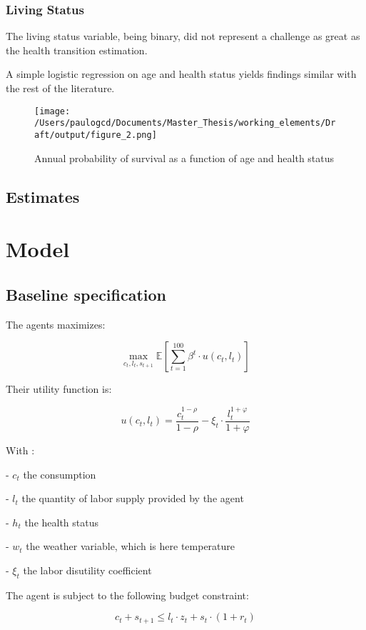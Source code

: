\documentclass{article}
\begin{document}
\subsubsection{Living Status}

The living status variable, being binary, did not represent a challenge
as great as the health transition estimation.

A simple logistic regression on age and health status yields findings similar with the
rest of the literature. 

\begin{figure}[ht]
    \texttt{[image: /Users/paulogcd/Documents/Master\_Thesis/working\_elements/Draft/output/figure\_2.png]}
    \caption{Annual probability of survival as a function of age and health status}
\end{figure}


\subsection{Estimates}

\section{Model}

\subsection{Baseline specification }

The agents maximizes: 

$$ \max_{c_{t},l_{t},s_{t+1}}{\mathbb{E}\left[\sum_{t=1}^{100} \beta^{t}\cdot u(c_t,l_t)\right]}$$

Their utility function is: 

$$u(c_{t},l_{t}) = \frac{c_{t}^{1-\rho}}{1-\rho}-\xi_{t}\cdot \frac{l_{t}^{1+\varphi}}{1+\varphi}$$

With : 

-  $c_{t}$  the consumption

-  $l_{t}$  the quantity of labor supply provided by the agent

-  $h_{t}$  the health status

-  $w_{t}$  the weather variable, which is here temperature

-  $\xi_{t}$ the labor disutility coefficient

The agent is subject to the following budget constraint:

$$c_{t} + s_{t+1} \leq l_{t}\cdot z_{t} + s_{t}\cdot(1+r_{t})$$
\end{document}
